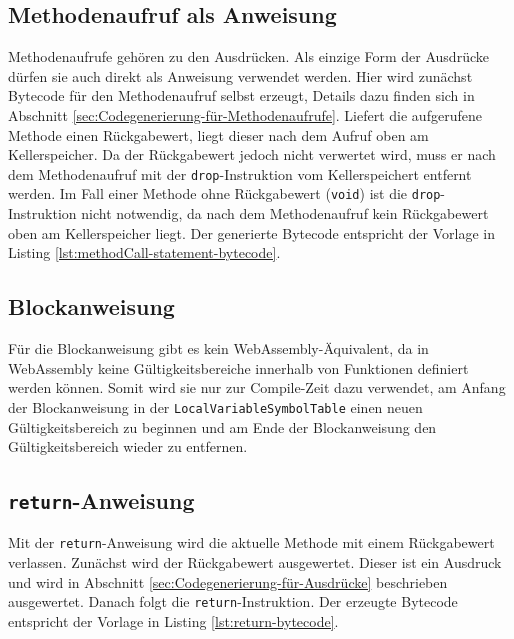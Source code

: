 \subsection{Methodenaufruf als Anweisung}
Methodenaufrufe gehören zu den Ausdrücken. Als einzige Form der Ausdrücke dürfen sie auch direkt als Anweisung verwendet werden. Hier wird zunächst Bytecode für den Methodenaufruf selbst erzeugt, Details dazu finden sich in Abschnitt \ref{sec:Codegenerierung-für-Methodenaufrufe}. Liefert die aufgerufene Methode einen Rückgabewert, liegt dieser nach dem Aufruf oben am Kellerspeicher. Da der Rückgabewert jedoch nicht verwertet wird, muss er nach dem Methodenaufruf mit der \lstinline{drop}-Instruktion vom Kellerspeichert entfernt werden. Im Fall einer Methode ohne Rückgabewert (\lstinline{void}) ist die \lstinline{drop}-Instruktion nicht notwendig, da nach dem Methodenaufruf kein Rückgabewert oben am Kellerspeicher liegt. Der generierte Bytecode entspricht der Vorlage in Listing \ref{lst:methodCall-statement-bytecode}.



\subsection{Blockanweisung}
Für die Blockanweisung gibt es kein WebAssembly-Äquivalent, da in WebAssembly keine Gültigkeitsbereiche innerhalb von Funktionen definiert werden können. Somit wird sie nur zur Compile-Zeit dazu verwendet, am Anfang der Blockanweisung in der \lstinline{LocalVariableSymbolTable} einen neuen Gültigkeitsbereich zu beginnen und am Ende der Blockanweisung den Gültigkeitsbereich wieder zu entfernen.

\subsection{\lstinline{return}-Anweisung}
Mit der \lstinline{return}-Anweisung wird die aktuelle Methode mit einem Rückgabewert verlassen. Zunächst wird der Rückgabewert ausgewertet. Dieser ist ein Ausdruck und wird in Abschnitt \ref{sec:Codegenerierung-für-Ausdrücke} beschrieben ausgewertet. Danach folgt die \lstinline{return}-Instruktion. Der erzeugte Bytecode entspricht der Vorlage in Listing \ref{lst:return-bytecode}.



